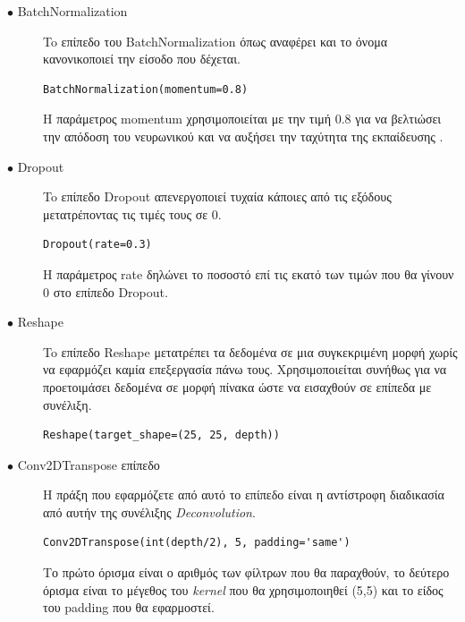 \begin{description}
\item[$\bullet$ BatchNormalization] To επίπεδο του BatchNormalization όπως αναφέρει και το όνομα κανονικοποιεί την είσοδο που δέχεται. \cite{batch}
\par
\begin{verbatim}
BatchNormalization(momentum=0.8)
\end{verbatim}
\par
Η παράμετρος momentum χρησιμοποιείται με την τιμή 0.8 για να βελτιώσει την απόδοση του νευρωνικού και να αυξήσει την ταχύτητα της εκπαίδευσης \cite{firstgan}.
\end{description}

\begin{description}
\item[$\bullet$ Dropout] To επίπεδο Dropout απενεργοποιεί τυχαία κάποιες από τις εξόδους μετατρέποντας τις τιμές τους σε 0. \cite{dropout}
\par
\begin{verbatim}
Dropout(rate=0.3)
\end{verbatim}
\par
H παράμετρος rate δηλώνει το ποσοστό επί τις εκατό των τιμών που θα γίνουν 0 στο επίπεδο Dropout.
\end{description}

\begin{description}
\item[$\bullet$ Reshape] To επίπεδο Reshape μετατρέπει τα δεδομένα σε μια συγκεκριμένη μορφή χωρίς να εφαρμόζει καμία επεξεργασία πάνω τους. Χρησιμοποιείται συνήθως για να προετοιμάσει δεδομένα σε μορφή πίνακα ώστε να εισαχθούν σε επίπεδα με συνέλιξη. \cite{reshape}
\par
\begin{verbatim}
Reshape(target_shape=(25, 25, depth))
\end{verbatim}
\end{description}

\begin{description}
\item[$\bullet$ Conv2DTranspose επίπεδο] H πράξη που εφαρμόζετε από αυτό το επίπεδο είναι η αντίστροφη διαδικασία από αυτήν της συνέλιξης \textit{Deconvolution}. \cite{conv2dtranspose}
\begin{verbatim}
Conv2DTranspose(int(depth/2), 5, padding='same')
\end{verbatim}
\par
Το πρώτο όρισμα είναι ο αριθμός των φίλτρων που θα παραχθούν, το δεύτερο όρισμα είναι το μέγεθος του \textit{kernel} που θα χρησιμοποιηθεί (5,5) και το είδος του padding που θα εφαρμοστεί.
\end{description}

